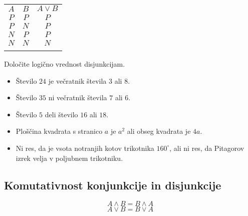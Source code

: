                     \begin{table}[H]
                        \centering
                        \begin{tabular}{||c|c|c||} 
                        \hhline{|t:===:t|}
                        \rowcolor[rgb]{0.843,0.718,0.718} $A$ & $B$ & $A\lor B$  \\ 
                        \hhline{|:===:|}
                        $P$ & $P$ & $P$                         \\ 
                        \hline
                        $P$ & $N$ & $P$                         \\ 
                        \hline
                        $N$ & $P$ & $P$                         \\ 
                        \hline
                        $N$ & $N$ & $N$                         \\
                        \hhline{|b:===:b|}
                        \end{tabular}
                    \end{table}



         

         
             \begin{naloga}
                Določite logično vrednost disjunkcijam.
                \begin{itemize}
                    \item Število $24$ je večratnik števila $3$ ali $8$.
                    \item Število $35$ ni večratnik števila $7$ ali $6$.
                    \item Število $5$ deli število $16$ ali $18$.
                    \item Ploščina kvadrata s stranico $a$ je $a^2$ ali obseg kvadrata je $4a$.
                    \item Ni res, da je vsota notranjih kotov trikotnika $160^\circ$, ali ni res, 
                        da Pitagorov izrek velja v poljubnem trikotniku.
                \end{itemize}
            \end{naloga}
         


         
             \subsection{Komutativnost konjunkcije in disjunkcije}
                $$ A\land B = B\land A $$
                $$ A\lor B = B\lor A$$
                   
